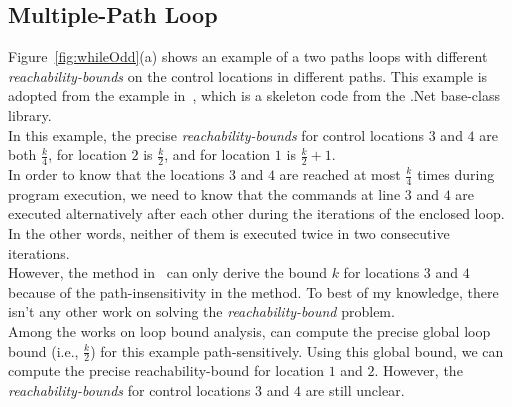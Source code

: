 \subsection{Multiple-Path Loop}
\label{sec:overview-multiplepath}

Figure~\ref{fig:whileOdd}(a) shows an example of a two paths loops
with different \emph{reachability-bounds} on the control locations in different paths.
This example is adopted from the example in~\cite{Sumit2010rechability}, which
is a skeleton code from the .Net base-class library.
\\
In this example,
the precise \emph{reachability-bounds} for control locations $3$ and $4$ are both $\frac{k}{4}$,
for location $2$ is $\frac{k}{2}$, and for location $1$ is $\frac{k}{2} + 1$.
\\
In order to know that the locations $3$ and $4$ are reached at most $\frac{k}{4}$ times during program execution,
we need to know that the commands at line $3$ and $4$ are executed alternatively after each other
during the iterations of the enclosed loop.
In the other words, neither of them is executed twice in two consecutive iterations.
\\
However, the method in~\cite{Sumit2010rechability}
can only derive the bound $k$ for locations $3$ and $4$ because of the path-insensitivity in the method.
To best of my knowledge, there isn't any other work on solving the \emph{reachability-bound} problem.
\\
Among the works on loop bound analysis, \cite{GulwaniJK09} can compute the precise global
loop bound (i.e., $\frac{k}{2}$) for this example path-sensitively.
Using this global bound, we can compute the precise reachability-bound for location $1$ and $2$.
However, the  \emph{reachability-bounds} for control locations $3$ and $4$ are still unclear.
